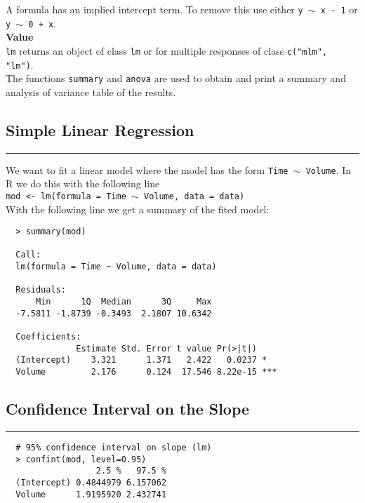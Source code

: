 A formula has an implied intercept term. To remove this use either \texttt{y $\sim$ x - 1} or \texttt{y $\sim$ 0 + x}.\\

\textbf{Value}\\
\texttt{lm} returns an object of class \texttt{lm} or for multiple responses of class \texttt{c("mlm", "lm")}.\\

The functions \texttt{summary} and \texttt{anova} are used to obtain and print a summary and analysis of variance table of the results.\\

\subsection{Simple Linear Regression}
\noindent\rule[\linienAbstand]{\linewidth}{\linienDicke}
We want to fit a linear model where the model has the form \texttt{Time $\sim$ Volume}. In R we do this with the following line\\
\texttt{mod <- lm(formula = Time $\sim$ Volume, data = data)}\\

With the following line we get a summary of the fited model:\\
\begingroup
\scriptsize
\begin{verbatim}
  > summary(mod)

  Call:
  lm(formula = Time ~ Volume, data = data)

  Residuals:
      Min      1Q  Median      3Q     Max
  -7.5811 -1.8739 -0.3493  2.1807 10.6342

  Coefficients:
              Estimate Std. Error t value Pr(>|t|)
  (Intercept)    3.321      1.371   2.422   0.0237 *
  Volume         2.176      0.124  17.546 8.22e-15 ***

\end{verbatim}
\endgroup
\vspace{\baselineskip}

\subsection{Confidence Interval on the Slope}
\noindent\rule[\linienAbstand]{\linewidth}{\linienDicke}
\begingroup
\scriptsize
\begin{verbatim}
  # 95% confidence interval on slope (lm)
  > confint(mod, level=0.95)
                  2.5 %   97.5 %
  (Intercept) 0.4844979 6.157062
  Volume      1.9195920 2.432741
\end{verbatim}
\endgroup
\vspace{\baselineskip}

